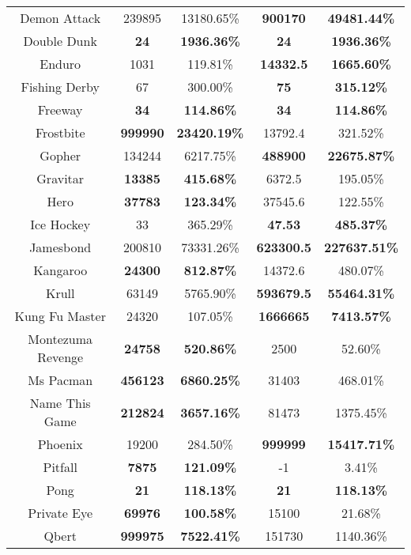 \begin{table}[!hb]
\begin{center}
\begin{tabular}{c cc cc }
        Demon Attack & 239895 & 13180.65\% & \textbf{900170} & \textbf{49481.44\%} \\  
        Double Dunk & \textbf{24} & \textbf{1936.36\%} & \textbf{24} & \textbf{1936.36\%} \\  
        Enduro & 1031 & 119.81\% & \textbf{14332.5} & \textbf{1665.60\%} \\  
        Fishing Derby & 67 & 300.00\% & \textbf{75} & \textbf{315.12\%} \\  
        Freeway & \textbf{34} & \textbf{114.86\%} & \textbf{34} & \textbf{114.86\%} \\  
        Frostbite & \textbf{999990} & \textbf{23420.19\%} & 13792.4 & 321.52\% \\  
        Gopher & 134244 & 6217.75\% & \textbf{488900} & \textbf{22675.87\%} \\  
        Gravitar & \textbf{13385} & \textbf{415.68\%} & 6372.5 & 195.05\% \\  
        Hero & \textbf{37783} & \textbf{123.34\%} & 37545.6 & 122.55\% \\  
        Ice Hockey & 33 & 365.29\% & \textbf{47.53} & \textbf{485.37\%} \\  
        Jamesbond & 200810 & 73331.26\% & \textbf{623300.5} & \textbf{227637.51\%} \\  
        Kangaroo & \textbf{24300} & \textbf{812.87\%} & 14372.6 & 480.07\% \\  
        Krull & 63149 & 5765.90\% & \textbf{593679.5} &\textbf{ 55464.31\%} \\  
        Kung Fu Master & 24320 & 107.05\% & \textbf{1666665} & \textbf{7413.57\%} \\  
        Montezuma Revenge & \textbf{24758} & \textbf{520.86\%} & 2500 & 52.60\% \\  
        Ms Pacman & \textbf{456123} & \textbf{6860.25\%} & 31403 & 468.01\% \\  
        Name This Game & \textbf{212824} & \textbf{3657.16\%} & 81473 & 1375.45\% \\  
        Phoenix & 19200 & 284.50\% & \textbf{999999} & \textbf{15417.71\%} \\  
        Pitfall & \textbf{7875} & \textbf{121.09\%} & -1 & 3.41\% \\  
        Pong & \textbf{21} & \textbf{118.13\%} & \textbf{21} & \textbf{118.13\%} \\  
        Private Eye &\textbf{ 69976} & \textbf{100.58\%} & 15100 & 21.68\% \\  
        Qbert & \textbf{999975} & \textbf{7522.41\%} & 151730 & 1140.36\% \\  

\end{tabular}
\end{center}
\end{table}
